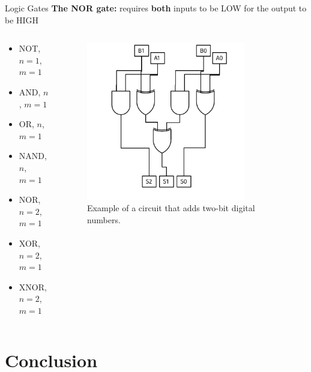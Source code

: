 \documentclass{beamer}
\begin{document}
\begin{frame}{Logic Gates}
\textbf{The NOR gate:} requires \textbf{both} inputs to be LOW for the output to be HIGH \\ \vspace{0.5cm}
\begin{columns}[T]
\begin{column}{0.5\textwidth}
\begin{itemize}
\item \alert{NOT, $n=1$, $m=1$}
\item \alert{AND, $n$, $m=1$}
\item \alert{OR, $n$, $m=1$}
\item \alert{NAND, $n$, $m=1$}
\item \alert{NOR, $n=2$, $m=1$}
\item \alert{XOR, $n=2$, $m=1$}
\item \alert{XNOR, $n=2$, $m=1$}
\end{itemize}
\end{column}
\begin{column}{0.5\textwidth}
\begin{figure}
\centering
\includegraphics[width=0.8\textwidth]{figures/TwoBitAdder.pdf}
\caption{\label{fig:add} Example of a circuit that adds two-bit digital numbers.}
\end{figure}
\end{column}
\end{columns}
\end{frame}

\section{Conclusion}
\end{document}

